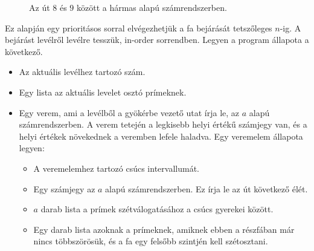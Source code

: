 \documentclass[12pt]{report}
\begin{document}
\begin{figure}[ht]
\centering
{}
\caption{Az út $8$ és $9$ között a hármas alapú számrendszerben.}
\label{fig:P389}
\end{figure}

Ez alapján egy prioritásos sorral elvégezhetjük a fa bejárását
tetszőleges $n$-ig.
A bejárást levélről levélre tesszük, in-order sorrendben.
Legyen a program állapota a következő.
\begin{itemize}
\item Az aktuális levélhez tartozó szám.
\item Egy lista az aktuális levelet osztó prímeknek.
\item Egy verem, ami a levélből a gyökérbe vezető utat írja le,
az $a$ alapú számrendszerben.
A verem tetején a legkisebb helyi értékű számjegy van,
és a helyi értékek növekednek a veremben lefele haladva.
Egy veremelem állapota legyen:
\begin{itemize}
\item A veremelemhez tartozó csúcs intervallumát.
\item Egy számjegy az $a$ alapú számrendszerben. Ez írja le az út következő élét.
\item $a$ darab lista a prímek szétválogatásához a csúcs gyerekei között.
\item Egy darab lista azoknak a prímeknek, amiknek ebben a részfában már
nincs többszörösük, és a fa egy felsőbb szintjén kell szétosztani.
\end{itemize}
\end{itemize}
\end{document}
